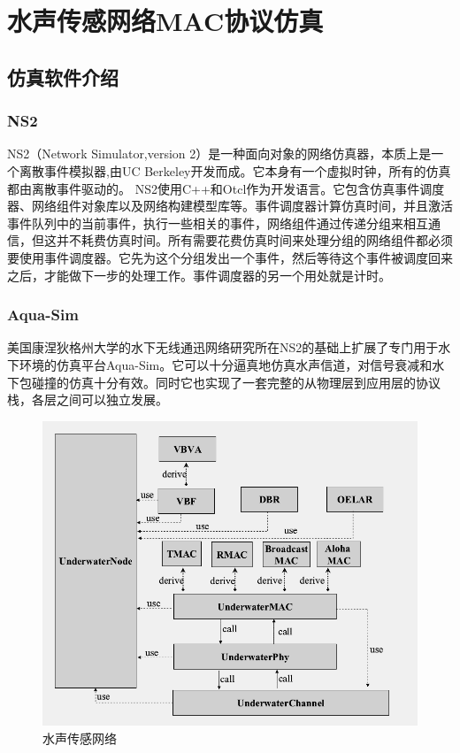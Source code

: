 \chapter{水声传感网络MAC协议仿真}
\section {仿真软件介绍}
\subsection{NS2}
NS2（Network Simulator,version 2）是一种面向对象的网络仿真器，本质上是一个离散事件模拟器,由UC Berkeley开发而成。它本身有一个虚拟时钟，所有的仿真都由离散事件驱动的。
NS2使用C++和Otcl作为开发语言。它包含仿真事件调度器、网络组件对象库以及网络构建模型库等。事件调度器计算仿真时间，并且激活事件队列中的当前事件，执行一些相关的事件，网络组件通过传递分组来相互通信，但这并不耗费仿真时间。所有需要花费仿真时间来处理分组的网络组件都必须要使用事件调度器。它先为这个分组发出一个事件，然后等待这个事件被调度回来之后，才能做下一步的处理工作。事件调度器的另一个用处就是计时。

\subsection{Aqua-Sim}
美国康涅狄格州大学的水下无线通迅网络研究所在NS2的基础上扩展了专门用于水下环境的仿真平台Aqua-Sim。它可以十分逼真地仿真水声信道，对信号衰减和水下包碰撞的仿真十分有效。同时它也实现了一套完整的从物理层到应用层的协议栈，各层之间可以独立发展。

 \begin{figure}[!ht]
 	\centering
 	\includegraphics[scale=0.5]{figures/aq.png}
 	\caption{
 		水声传感网络
 	}
 	\label{fig:example}
 \end{figure}
